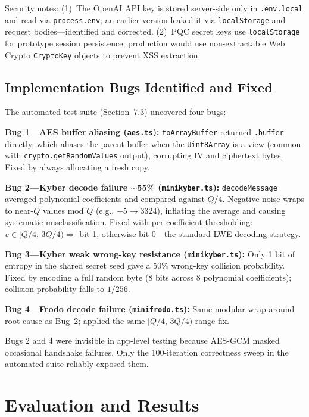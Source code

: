 \documentclass[11pt,a4paper]{article}
\begin{document}
Security notes: (1)~The OpenAI API key is stored server-side only in \texttt{.env.local} and read via \texttt{process.env}; an earlier version leaked it via \texttt{localStorage} and request bodies---identified and corrected. (2)~PQC secret keys use \texttt{localStorage} for prototype session persistence; production would use non-extractable Web Crypto \texttt{CryptoKey} objects to prevent XSS extraction.

\subsection{Implementation Bugs Identified and Fixed}

The automated test suite (Section~7.3) uncovered four bugs:

\textbf{Bug 1---AES buffer aliasing (\texttt{aes.ts}):} \texttt{toArrayBuffer} returned \texttt{.buffer} directly, which aliases the parent buffer when the \texttt{Uint8Array} is a view (common with \texttt{crypto.getRandomValues} output), corrupting IV and ciphertext bytes. Fixed by always allocating a fresh copy.

\textbf{Bug 2---Kyber decode failure $\sim$55\% (\texttt{minikyber.ts}):} \texttt{decodeMessage} averaged polynomial coefficients and compared against $Q/4$. Negative noise wraps to near-$Q$ values mod $Q$ (e.g., $-5\to3324$), inflating the average and causing systematic misclassification. Fixed with per-coefficient thresholding: $v\in[Q/4,\,3Q/4)\Rightarrow$ bit 1, otherwise bit 0---the standard LWE decoding strategy.

\textbf{Bug 3---Kyber weak wrong-key resistance (\texttt{minikyber.ts}):} Only 1 bit of entropy in the shared secret seed gave a 50\% wrong-key collision probability. Fixed by encoding a full random byte (8 bits across 8 polynomial coefficients); collision probability falls to $1/256$.

\textbf{Bug 4---Frodo decode failure (\texttt{minifrodo.ts}):} Same modular wrap-around root cause as Bug~2; applied the same $[Q/4,\,3Q/4)$ range fix.

Bugs 2 and 4 were invisible in app-level testing because AES-GCM masked occasional handshake failures. Only the 100-iteration correctness sweep in the automated suite reliably exposed them.

\section{Evaluation and Results}
\end{document}
